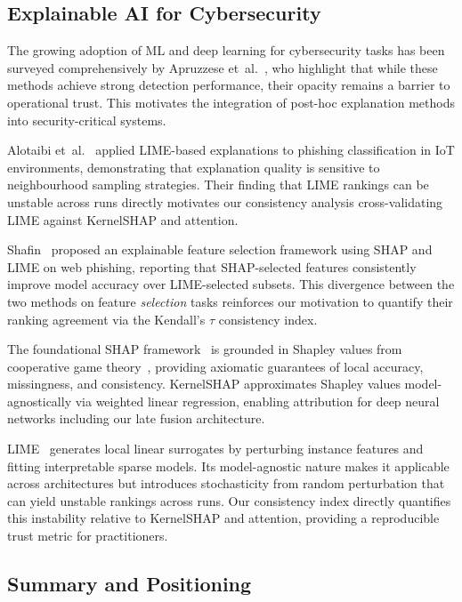 \documentclass[conference]{IEEEtran}
\begin{document}
\subsection{Explainable AI for Cybersecurity}

The growing adoption of ML and deep learning for cybersecurity tasks has been surveyed comprehensively by Apruzzese et~al.~\cite{apruzzese2023}, who highlight that while these methods achieve strong detection performance, their opacity remains a barrier to operational trust. This motivates the integration of post-hoc explanation methods into security-critical systems.

Alotaibi et~al.~\cite{alotaibi2025} applied LIME-based explanations to
phishing classification in IoT environments, demonstrating that explanation
quality is sensitive to neighbourhood sampling strategies. Their finding
that LIME rankings can be unstable across runs directly motivates our
consistency analysis cross-validating LIME against KernelSHAP and attention.

Shafin~\cite{shafin2025} proposed an explainable feature selection
framework using SHAP and LIME on web phishing, reporting that SHAP-selected
features consistently improve model accuracy over LIME-selected subsets.
This divergence between the two methods on feature \emph{selection} tasks
reinforces our motivation to quantify their ranking agreement via the
Kendall's $\tau$ consistency index.

The foundational SHAP framework~\cite{lundberg2017} is grounded in Shapley
values from cooperative game theory~\cite{shapley1953}, providing axiomatic
guarantees of local accuracy, missingness, and consistency. KernelSHAP
approximates Shapley values model-agnostically via weighted linear regression,
enabling attribution for deep neural networks including our late fusion
architecture.

LIME~\cite{ribeiro2016} generates local linear surrogates by perturbing
instance features and fitting interpretable sparse models. Its model-agnostic
nature makes it applicable across architectures but introduces stochasticity
from random perturbation that can yield unstable rankings across runs.
Our consistency index directly quantifies this instability relative to
KernelSHAP and attention, providing a reproducible trust metric for
practitioners.

\subsection{Summary and Positioning}
\label{subsec:related_summary}
\end{document}
